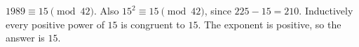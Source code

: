 $1989\equiv15\pmod{42}$. Also $15^2\equiv15\pmod{42}$, since $225-15=210$. Inductively every positive power of $15$ is congruent to $15$. The exponent is positive, so the answer is $\boxed{15}$.
